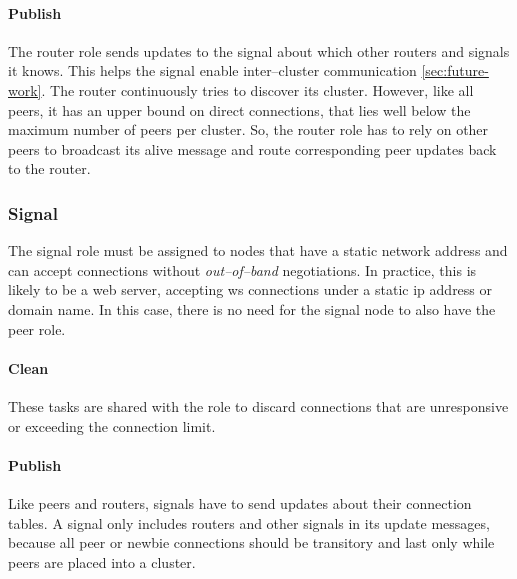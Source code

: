 \paragraph{Publish}
\begin{itemize}
     The router role sends updates to the signal about which other routers and signals it knows. This helps the signal enable inter–cluster communication \cref{sec:future-work}.
     The router continuously tries to discover its cluster. However, like all peers, it has an upper bound on direct connections, that lies well below the maximum number of peers per cluster. So, the router role has to rely on other peers to broadcast its alive message and route corresponding peer updates back to the router.
\end{itemize}

\subsubsection{Signal}\label{sec:design-roles-signal}
The signal role must be assigned to nodes that have a static network address and can accept connections without \textit{out–of–band} negotiations. In practice, this is likely to be a web server, accepting \gls{ws} connections under a static \gls{ip} address or domain name. In this case, there is no need for the signal node to also have the peer role.

\paragraph{Clean}
\begin{itemize}
     These tasks are shared with the \peerRole role to discard connections that are unresponsive or exceeding the connection limit.
\end{itemize}

\paragraph{Publish}
\begin{itemize}
     Like peers and routers, signals have to send updates about their connection tables. A signal only includes routers and other signals in its update messages, because all peer or newbie connections should be transitory and last only while peers are placed into a cluster.
\end{itemize}

